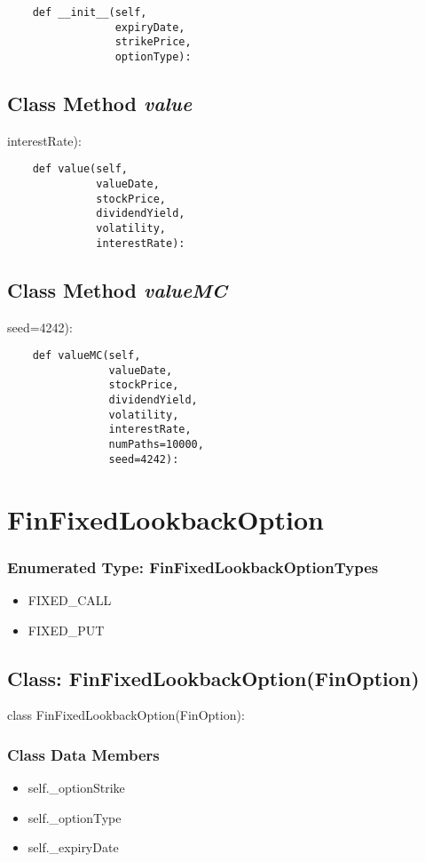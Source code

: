 \documentclass[twoside,11pt]{book}
\begin{document}
\begin{lstlisting}
    def __init__(self,
                 expiryDate,
                 strikePrice,
                 optionType):
\end{lstlisting}

\subsection{Class Method {\it value}}
interestRate):

\begin{lstlisting}
    def value(self,
              valueDate,
              stockPrice,
              dividendYield,
              volatility,
              interestRate):
\end{lstlisting}

\subsection{Class Method {\it valueMC}}
seed=4242):

\begin{lstlisting}
    def valueMC(self,
                valueDate,
                stockPrice,
                dividendYield,
                volatility,
                interestRate,
                numPaths=10000,
                seed=4242):
\end{lstlisting}

\newpage
\section{FinFixedLookbackOption}

\subsubsection{Enumerated Type: FinFixedLookbackOptionTypes}
\begin{itemize}
\item{FIXED\_CALL}
\item{FIXED\_PUT}
\end{itemize}

\subsection{Class: FinFixedLookbackOption(FinOption)}
class FinFixedLookbackOption(FinOption):

\subsubsection{Class Data Members}
\begin{itemize}
\item{self.\_optionStrike}
\item{self.\_optionType}
\item{self.\_expiryDate}
\end{itemize}
\end{document}
